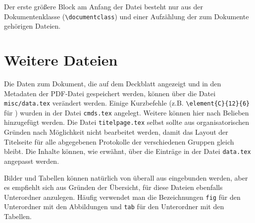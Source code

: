 Der erste größere Block am Anfang der Datei besteht nur aus der Dokumentenklasse (\verb|\documentclass|) und einer Aufzählung der zum Dokumente gehörigen Dateien.
\begin{document}
\section{Weitere Dateien}
Die Daten zum Dokument, die auf dem Deckblatt angezeigt und in den Metadaten der PDF-Datei gespeichert werden, können über die Datei \verb|misc/data.tex| verändert werden. Einige Kurzbefehle (z.B. \verb|\element{C}{12}{6}| für ) wurden in der Datei \verb|cmds.tex| angelegt. Weitere können hier nach Belieben hinzugefügt werden. Die Datei \verb|titelpage.tex| selbst sollte aus organisatorischen Gründen nach Möglichkeit nicht bearbeitet werden, damit das Layout der Titelseite für alle abgegebenen Protokolle der verschiedenen Gruppen gleich bleibt. Die Inhalte können, wie erwähnt, über die Einträge in der Datei \verb|data.tex| angepasst werden.

Bilder und Tabellen können natürlich von überall aus eingebunden werden, aber es empfiehlt sich aus Gründen der Übersicht, für diese Dateien ebenfalls Unterordner anzulegen. Häufig verwendet man die Bezeichnungen \verb|fig| für den Unterordner mit den Abbildungen und \verb|tab| für den Unterordner mit den Tabellen.
\end{document}
